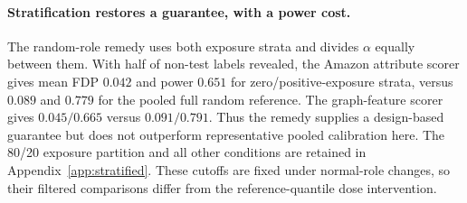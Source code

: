 \paragraph{Stratification restores a guarantee, with a power cost.}
The random-role remedy uses both exposure strata and divides $\alpha$ equally between them. With half of non-test labels revealed, the Amazon attribute scorer gives mean FDP $0.042$ and power $0.651$ for zero/positive-exposure strata, versus $0.089$ and $0.779$ for the pooled full random reference. The graph-feature scorer gives $0.045/0.665$ versus $0.091/0.791$. Thus the remedy supplies a design-based guarantee but does not outperform representative pooled calibration here. The 80/20 exposure partition and all other conditions are retained in Appendix~\ref{app:stratified}. These cutoffs are fixed under normal-role changes, so their filtered comparisons differ from the reference-quantile dose intervention.

